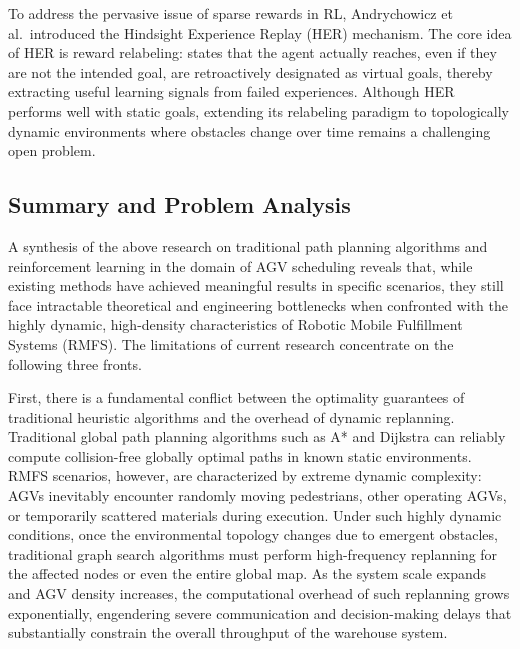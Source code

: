 To address the pervasive issue of sparse rewards in RL, Andrychowicz et al.\ introduced the Hindsight Experience Replay (HER) mechanism. The core idea of HER is reward relabeling: states that the agent actually reaches, even if they are not the intended goal, are retroactively designated as virtual goals, thereby extracting useful learning signals from failed experiences. Although HER performs well with static goals, extending its relabeling paradigm to topologically dynamic environments where obstacles change over time remains a challenging open problem.

\subsection{Summary and Problem Analysis}

A synthesis of the above research on traditional path planning algorithms and reinforcement learning in the domain of AGV scheduling reveals that, while existing methods have achieved meaningful results in specific scenarios, they still face intractable theoretical and engineering bottlenecks when confronted with the highly dynamic, high-density characteristics of Robotic Mobile Fulfillment Systems (RMFS). The limitations of current research concentrate on the following three fronts.

First, there is a fundamental conflict between the optimality guarantees of traditional heuristic algorithms and the overhead of dynamic replanning. Traditional global path planning algorithms such as A* and Dijkstra can reliably compute collision-free globally optimal paths in known static environments. RMFS scenarios, however, are characterized by extreme dynamic complexity: AGVs inevitably encounter randomly moving pedestrians, other operating AGVs, or temporarily scattered materials during execution. Under such highly dynamic conditions, once the environmental topology changes due to emergent obstacles, traditional graph search algorithms must perform high-frequency replanning for the affected nodes or even the entire global map. As the system scale expands and AGV density increases, the computational overhead of such replanning grows exponentially, engendering severe communication and decision-making delays that substantially constrain the overall throughput of the warehouse system.

